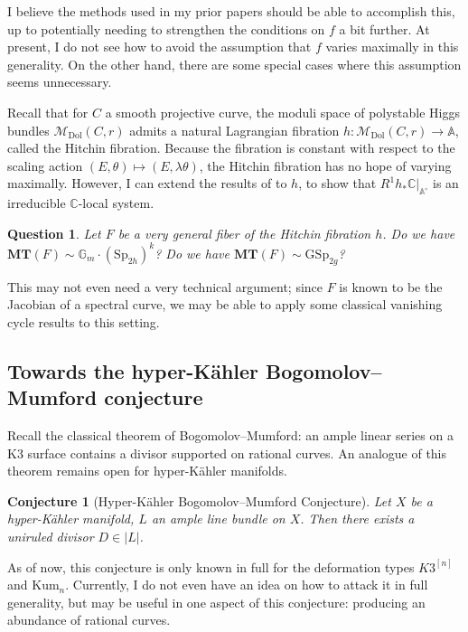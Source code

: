 \documentclass[12pt]{amsart}
\newcommand{\C}{\mathbb{C}}
\newcommand{\Sp}{\mathrm{Sp}}
\newtheorem{question}[theorem]{Question}
\newtheorem{conjecture}[theorem]{Conjecture}
\theoremstyle{definition}
\numberwithin{equation}{section}
\begin{document}
I believe the methods used in my prior papers should be able to accomplish this, 
up to potentially needing to strengthen the conditions on \(f\) a bit further. 
At present, I do not see how to avoid the assumption that \(f\) varies maximally 
in this generality. On the other hand, there are some special cases where this 
assumption seems unnecessary. 

Recall that for \(C\) a smooth projective curve, the moduli space of polystable Higgs 
bundles \(\mathcal{M}_\mathrm{Dol}(C, r)\) admits a natural Lagrangian fibration 
\(h: \mathcal{M}_\mathrm{Dol}(C, r) \to \mathbb{A}\), called the Hitchin fibration.
Because the fibration is constant with respect to the scaling action 
\((E, \theta) \mapsto (E, \lambda \theta)\), the Hitchin fibration has no hope of 
varying maximally. However, I can extend the results of \cite{varvak25} to 
\(h\), to show that \(R^1 h_* \C|_{\mathbb{A}^\circ}\) is an irreducible 
\(\C\)-local system. 

\begin{question}
    Let \(F\) be a very general fiber of the Hitchin fibration \(h\). 
    Do we have \(\mathbf{MT}(F) \sim \mathbb{G}_m \cdot (\Sp_{2h})^k\)? 
    Do we have \(\mathbf{MT}(F) \sim \mathrm{GSp}_{2g}\)?
\end{question}

This may not even need a very technical argument; since \(F\) is known to be 
the Jacobian of a spectral curve, we may be able to apply some classical 
vanishing cycle results to this setting.






\subsection{Towards the hyper-K\"ahler Bogomolov--Mumford conjecture}

Recall the classical theorem of Bogomolov--Mumford: an ample linear series on a 
K3 surface contains a divisor supported on rational curves. An analogue of this 
theorem remains open for hyper-K\"ahler manifolds.

\begin{conjecture}[Hyper-K\"ahler Bogomolov--Mumford Conjecture] \label{conjecture-BM}
    Let \(X\) be a hyper-K\"ahler manifold, \(L\) an ample line bundle on \(X\). 
    Then there exists a uniruled divisor \(D \in |L|\).
\end{conjecture}

As of now, this conjecture is only known in full for the deformation types \(K3^{[n]}\) 
and \(\mathrm{Kum}_n\). Currently, I do not even have an idea on how to attack it 
in full generality, but  may be useful in one aspect of this conjecture: 
producing an abundance of rational curves. 
\end{document}
